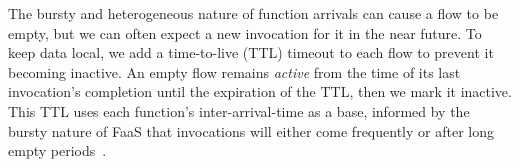 

The bursty and heterogeneous nature of function arrivals can cause a flow to be empty, but we can often expect a new invocation for it in the near future.
To keep data local, we add a time-to-live (TTL) timeout to each flow to prevent it becoming inactive.
An empty flow remains \emph{active} from the time of its last invocation's completion until the expiration of the TTL, then we mark it inactive.
This TTL uses each function's inter-arrival-time as a base, informed by the bursty nature of FaaS that invocations will either come frequently or after long empty periods~\cite{shahrad2020serverless}.

